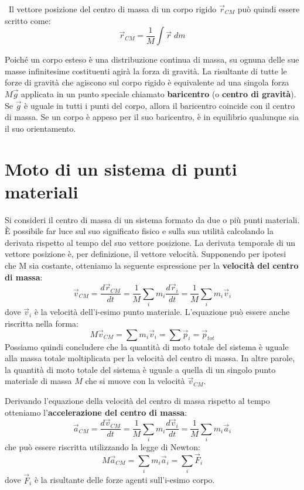 \documentclass[a4paper,11pt,oneside]{book}
\begin{document}
~\newline Il vettore posizione del centro di massa di un corpo rigido $\vec{r}_{CM}$ può quindi essere scritto come:
\begin{equation*}
    \vec{r}_{CM} = \frac{1}{M} \int \vec{r} \; dm
\end{equation*}

Poiché un corpo esteso è una distribuzione continua di massa, su ognuna delle sue masse infinitesime costituenti agirà la forza di gravità. La risultante di tutte le forze di gravità che agiscono sul corpo 
rigido è equivalente ad una singola forza $M \vec{g}$ applicata in un punto speciale chiamato \textbf{baricentro} (o \textbf{centro di gravità}). 
Se $\vec{g}$ è uguale in tutti i punti del corpo, allora il baricentro coincide con il centro di massa. Se un corpo è appeso per il suo baricentro, è in equilibrio qualunque sia il suo orientamento.

\section{Moto di un sistema di punti materiali}
Si consideri il centro di massa di un sistema formato da due o più punti materiali. È possibile far luce sul suo significato fisico e sulla sua utilità calcolando la derivata
rispetto al tempo del suo vettore posizione. La derivata temporale di un vettore posizione è, per definizione, il vettore velocità. Supponendo per ipotesi che M sia costante,
otteniamo la seguente espressione per la \textbf{velocità del centro di massa}:
\begin{equation*}
    \vec{v}_{CM} = \frac{d\vec{r}_{CM}}{dt} =   \frac{1}{M} \sum_i m_i \frac{d\vec{r}_i}{dt} = \frac{1}{M} \sum_i m_i \vec{v}_i
\end{equation*}
dove $\vec{v}_i$ è la velocità dell'i-esimo punto materiale. L'equazione può essere anche riscritta nella forma:
\begin{equation*}
    M\vec{v}_{CM} = \sum m_i \vec{v}_i = \sum \vec{p}_i = \vec{p}_{tot}
\end{equation*}
Possiamo quindi concludere che la quantità di moto totale del sistema è uguale alla massa totale moltiplicata per la velocità del centro di massa. In altre parole, 
la quantità di moto totale del sistema è uguale a quella di un singolo punto materiale di massa $M$ che si muove con la velocità $\vec{v}_{CM}$.

Derivando l'equazione della velocità del centro di massa rispetto al tempo otteniamo l'\textbf{accelerazione del centro di massa}:
\begin{equation*}
    \vec{a}_{CM} = \frac{d\vec{v}_{CM}}{dt} = \frac{1}{M} \sum_i m_i \frac{d\vec{v}_i}{dt} = \frac{1}{M} \sum_i m_i \vec{a}_i
\end{equation*}
che può essere riscritta utilizzando la legge di Newton:
\begin{equation*}
    M\vec{a}_{CM} = \sum_i m_i \vec{a}_i = \sum_i \vec{F}_i
\end{equation*}
dove $\vec{F}_i$ è la risultante delle forze agenti sull’i-esimo corpo.
\end{document}
